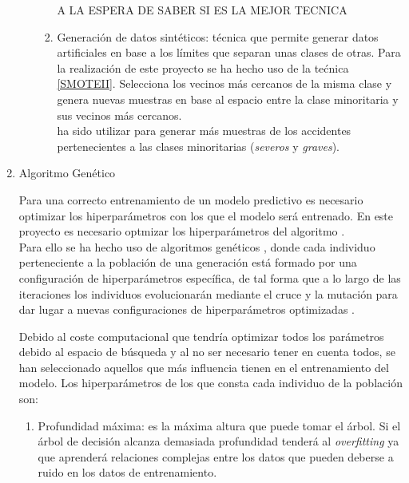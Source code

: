 \begin{enumerate}
\begin{enumerate}
\begin{enumerate}
                        A LA ESPERA DE SABER SI ES LA MEJOR TECNICA

                        \item Generación de datos sintéticos: técnica que permite generar datos artificiales en base a los límites que separan unas clases de otras. Para la realización de este proyecto se ha hecho uso de la tećnica  \ref{SMOTEII}. Selecciona los vecinos más cercanos de la misma clase y genera nuevas muestras en base al espacio entre la clase minoritaria y sus vecinos más cercanos.\\

                         ha sido utilizar para generar más muestras de los accidentes pertenecientes a las clases minoritarias (\textit{severos} y \textit{graves}).

                    \end{enumerate}

            \end{enumerate}



        \item Algoritmo Genético

            Para una correcto entrenamiento de un modelo predictivo es necesario optimizar los hiperparámetros con los que el modelo será entrenado. En este proyecto es necesario optmizar los hiperparámetros del algoritmo .\\

            Para ello se ha hecho uso de algoritmos genéticos \cite{GAXGBoostCode}, donde cada individuo perteneciente a la población de una generación está formado por una configuración de hiperparámetros específica, de tal forma que a lo largo de las iteraciones los individuos evolucionarán mediante el cruce y la mutación para dar lugar a nuevas configuraciones de hiperparámetros optimizadas \cite{GAXGBoostPaper}.

            Debido al coste computacional que tendría optimizar todos los parámetros debido al espacio de búsqueda y al no ser necesario tener en cuenta todos, se han seleccionado aquellos que más influencia tienen en el entrenamiento del modelo. Los hiperparámetros de los que consta cada individuo de la población son:

            \begin{enumerate}

                \item Profundidad máxima: es la máxima altura que puede tomar el árbol. Si el árbol de decisión alcanza demasiada profundidad tenderá al \textit{overfitting} ya que aprenderá relaciones complejas entre los datos que pueden deberse a ruido en los datos de entrenamiento.


\end{enumerate}
\end{enumerate}
